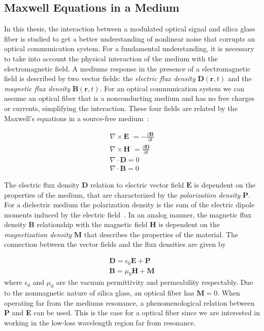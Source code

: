 \subsection{Maxwell Equations in a Medium}

In this thesis, the interaction between a modulated optical signal and silica glass fiber is studied to get a better understanding of nonlinear noise that corrupts an optical communication system. For a fundamental understanding, it is necessary to take into account the physical interaction of the medium with the electromagnetic field. A mediums response in the presence of a electromagnetic field is described by two vector fields: the \emph{electric flux density} $\textbf{D}(\textbf{r},t)$ and the \emph{magnetic flux density} $\textbf{B}(\textbf{r},t)$. For an optical communication system we can assume an optical fiber that is a nonconducting medium and has no free charges or currents, simplifying the interaction. These four fields are related by the  Maxwell's equations in a source-free medium~\cite{FundPhoto,FiberAgrawal}:


\begin{subequations}
\begin{gather}
\nabla \times \textbf{E }= -\frac{\partial \textbf{B}}{\partial t}\\
\nabla \times \textbf{H }= \frac{\partial \textbf{D}}{\partial t}\\
\nabla \cdot \textbf{D}= 0\\
\nabla \cdot \textbf{B}= 0
\label{eq:maxwell}
\end{gather}
\end{subequations}


The electric flux density $\textbf{D}$ relation to electric vector field $\textbf{E}$ is dependent on the properties of the medium, that are characterized by the \emph{polarization density} $\textbf{P}$. For a dielectric medium the polarization density is the sum of the electric dipole moments induced by the electric field~\cite{FundPhoto}. In an analog manner, the magnetic flux density $\textbf{B}$ relationship with the magnetic field $\textbf{H}$ is dependent on  the \emph{magnetization density} $\textbf{M}$ that describes the properties of the material. The connection between the vector fields and the flux densities  are given by

\begin{subequations}
\begin{gather}
\textbf{D}=\epsilon_0 \textbf{E}+\textbf{P}\\
\textbf{B}=\mu_0\textbf{H}+\textbf{M}%
\end{gather}
\end{subequations}
where $\epsilon_0$ and $\mu_0$ are the vacuum permittivity and permeability respectably. Due to the nonmagnetic nature of silica glass, an optical fiber has $\textbf{M}=0$. When operating far from the mediums resonance, a phenomenological relation between  \textbf{P} and \textbf{E} can be used. This is the case for a optical fiber since we are interested in working in the low-loss wavelength region far from resonance.

